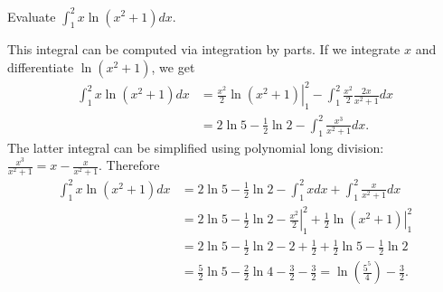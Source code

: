 \documentclass{ximera}
\begin{document}
\begin{question}%

Evaluate \(\displaystyle \int_1^2 x \ln (x^2 + 1) dx\).
\begin{multiplechoice}
\end{multiplechoice}
\begin{feedback}
This integral can be computed via integration by parts. If we integrate \(x\) and differentiate \(\ln (x^2+1)\), we get
\[\begin{aligned}
\int_1^2 x \ln (x^2+1) dx & = \left. \frac{x^2}{2} \ln (x^2+1) \right|_{1}^2 - \int_1^2 \frac{x^2}{2} \frac{2x}{x^2+1} dx \\
& = 2 \ln 5 - \frac{1}{2} \ln 2 - \int_1^2 \frac{x^3}{x^2+1} dx.
\end{aligned}\]
The latter integral can be simplified using polynomial long division: \(\displaystyle \frac{x^3}{x^2+1} = x - \frac{x}{x^2+1}\).
Therefore
\[\begin{aligned}
\int_1^2 x \ln (x^2+1) dx & = 2 \ln 5 - \frac{1}{2} \ln 2 - \int_1^2 x dx + \int_1^2 \frac{x}{x^2+1} dx \\
& = 2 \ln 5 - \frac{1}{2} \ln 2 - \left. \frac{x^2}{2} \right|_1^2 + \left. \frac{1}{2} \ln (x^2+1) \right|_1^2 \\
& = 2 \ln 5 - \frac{1}{2} \ln 2 - 2 + \frac{1}{2} + \frac{1}{2} \ln 5 - \frac{1}{2} \ln 2 \\
& = \frac{5}{2} \ln 5 - \frac{2}{2} \ln 4 - \frac{3}{2} - \frac{3}{2} = \ln \left( \frac{5^5}{4} \right) - \frac{3}{2}.
\end{aligned}\]
\end{feedback}

\end{question}
\end{document}
